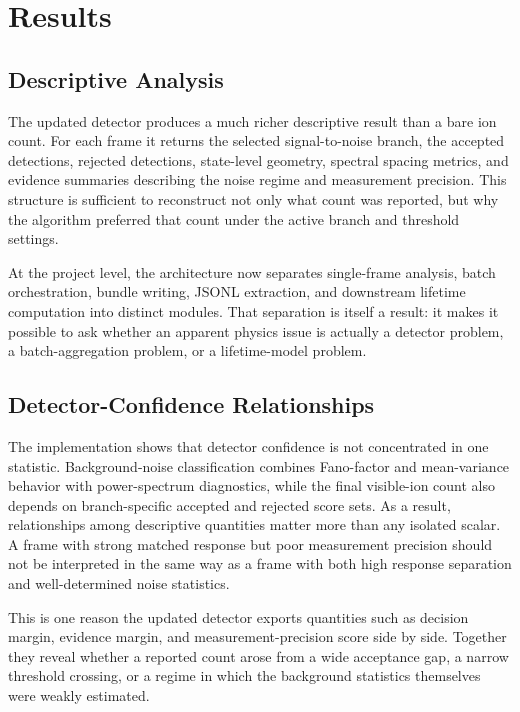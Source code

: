 \documentclass[12pt]{report}
\begin{document}
\chapter{Results}

\section{Descriptive Analysis}

The updated detector produces a much richer descriptive result than a bare ion count. For each frame it returns the selected signal-to-noise branch, the accepted detections, rejected detections, state-level geometry, spectral spacing metrics, and evidence summaries describing the noise regime and measurement precision. This structure is sufficient to reconstruct not only what count was reported, but why the algorithm preferred that count under the active branch and threshold settings.

At the project level, the architecture now separates single-frame analysis, batch orchestration, bundle writing, JSONL extraction, and downstream lifetime computation into distinct modules. That separation is itself a result: it makes it possible to ask whether an apparent physics issue is actually a detector problem, a batch-aggregation problem, or a lifetime-model problem.

\section{Detector-Confidence Relationships}

The implementation shows that detector confidence is not concentrated in one statistic. Background-noise classification combines Fano-factor and mean-variance behavior with power-spectrum diagnostics, while the final visible-ion count also depends on branch-specific accepted and rejected score sets. As a result, relationships among descriptive quantities matter more than any isolated scalar. A frame with strong matched response but poor measurement precision should not be interpreted in the same way as a frame with both high response separation and well-determined noise statistics.

This is one reason the updated detector exports quantities such as decision margin, evidence margin, and measurement-precision score side by side. Together they reveal whether a reported count arose from a wide acceptance gap, a narrow threshold crossing, or a regime in which the background statistics themselves were weakly estimated.
\end{document}
